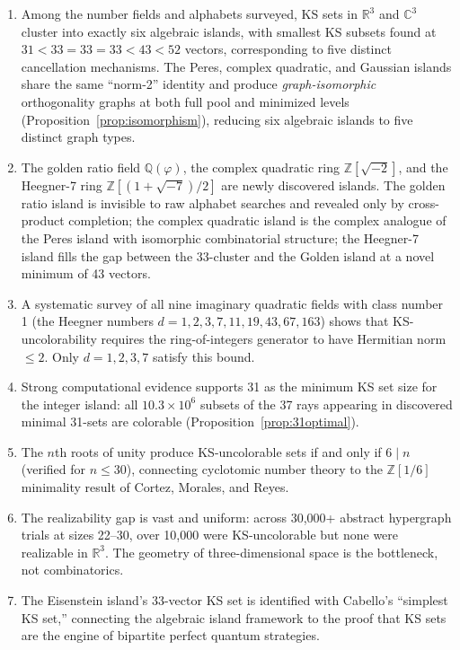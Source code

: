 \documentclass[12pt,a4paper]{article}
\newcommand{\R}{\mathbb{R}}
\newcommand{\C}{\mathbb{C}}
\newcommand{\Z}{\mathbb{Z}}
\newcommand{\Q}{\mathbb{Q}}
\begin{document}
\begin{enumerate}
    \item Among the number fields and alphabets surveyed, KS sets in $\R^3$ and $\C^3$ cluster into exactly six algebraic islands, with smallest KS subsets found at $31 < 33 = 33 = 33 < 43 < 52$ vectors, corresponding to five distinct cancellation mechanisms. The Peres, complex quadratic, and Gaussian islands share the same ``norm-2'' identity and produce \emph{graph-isomorphic} orthogonality graphs at both full pool and minimized levels (Proposition~\ref{prop:isomorphism}), reducing six algebraic islands to five distinct graph types.
    \item The golden ratio field $\Q(\varphi)$, the complex quadratic ring $\Z[\sqrt{-2}]$, and the Heegner-7 ring $\Z[(1+\sqrt{-7})/2]$ are newly discovered islands. The golden ratio island is invisible to raw alphabet searches and revealed only by cross-product completion; the complex quadratic island is the complex analogue of the Peres island with isomorphic combinatorial structure; the Heegner-7 island fills the gap between the 33-cluster and the Golden island at a novel minimum of 43 vectors.
    \item A systematic survey of all nine imaginary quadratic fields with class number 1 (the Heegner numbers $d = 1, 2, 3, 7, 11, 19, 43, 67, 163$) shows that KS-uncolorability requires the ring-of-integers generator to have Hermitian norm $\leq 2$. Only $d = 1, 2, 3, 7$ satisfy this bound.
    \item Strong computational evidence supports 31 as the minimum KS set size for the integer island: all $10.3 \times 10^6$ subsets of the 37 rays appearing in discovered minimal 31-sets are colorable (Proposition~\ref{prop:31optimal}).
    \item The $n$th roots of unity produce KS-uncolorable sets if and only if $6 \mid n$ (verified for $n \leq 30$), connecting cyclotomic number theory to the $\Z[1/6]$ minimality result of Cortez, Morales, and Reyes.
    \item The realizability gap is vast and uniform: across 30{,}000+ abstract hypergraph trials at sizes 22--30, over 10{,}000 were KS-uncolorable but none were realizable in $\R^3$. The geometry of three-dimensional space is the bottleneck, not combinatorics.
    \item The Eisenstein island's 33-vector KS set is identified with Cabello's ``simplest KS set,'' connecting the algebraic island framework to the proof that KS sets are the engine of bipartite perfect quantum strategies.

\end{enumerate}
\end{document}
